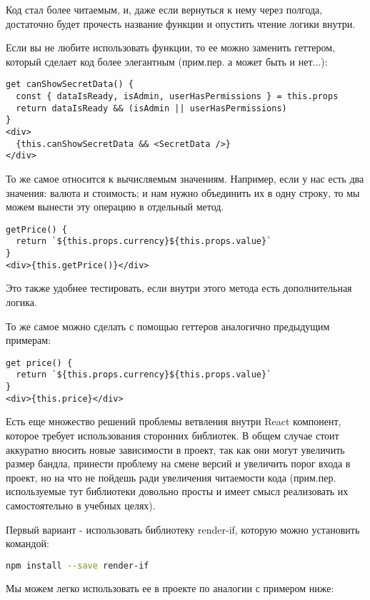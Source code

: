 Код стал более читаемым, и, даже если вернуться к нему через полгода, достаточно будет прочесть название функции и опустить чтение логики внутри.

Если вы не любите использовать функции, то ее можно заменить геттером, который сделает код более элегантным (прим.пер. а может быть и нет...):

\begin{lstlisting}
get canShowSecretData() {
  const { dataIsReady, isAdmin, userHasPermissions } = this.props
  return dataIsReady && (isAdmin || userHasPermissions)
}
<div>
  {this.canShowSecretData && <SecretData />}
</div>
\end{lstlisting}

То же самое относится к вычисляемым значениям. Например, если у нас есть два значения: валюта и стоимость; и нам нужно объединить их в одну строку, то мы можем вынести эту операцию в отдельный метод.

\begin{lstlisting}
getPrice() {
  return `${this.props.currency}${this.props.value}`
}
<div>{this.getPrice()}</div>
\end{lstlisting}

Это также удобнее тестировать, если внутри этого метода есть дополнительная логика.

То же самое можно сделать с помощью геттеров аналогично предыдущим примерам:

\begin{lstlisting}
get price() {
  return `${this.props.currency}${this.props.value}`
}
<div>{this.price}</div>
\end{lstlisting}

Есть еще множество решений проблемы ветвления внутри React компонент, которое требует использования сторонних библиотек. В общем случае стоит аккуратно вносить новые зависимости в проект, так как они могут увеличить размер бандла, принести проблему на смене версий и увеличить порог входа в проект, но на что не пойдешь ради увеличения читаемости кода (прим.пер. используемые тут библиотеки довольно просты и имеет смысл реализовать их самостоятельно в учебных целях).

Первый вариант - использовать библиотеку render-if, которую можно установить командой:
\begin{lstlisting}[language=bash]
npm install --save render-if
\end{lstlisting}

Мы можем легко использовать ее в проекте по аналогии с примером ниже:

